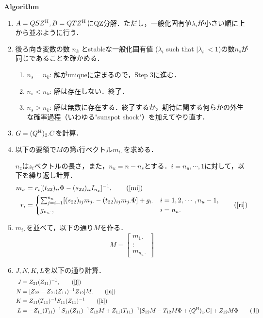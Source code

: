 \documentclass[a4j, dvipdfmx]{jarticle}
\begin{document}
\begin{itembox}[l]{{\bf Algorithm}}
\begin{enumerate}
\item $A = QSZ^{\rm{H}}, B = QTZ^{\rm{H}}$にQZ分解．ただし，一般化固有値$\lambda_i$が小さい順に上から並ぶように行う．
\item 後ろ向き変数の数 $n_k$ とstableな一般化固有値 ($\lambda_i$ such that $|\lambda_i|<1$)の数$n_s$が同じであることを確かめる．
\begin{enumerate}
\item $n_s = n_k$: 解がuniqueに定まるので，Step 3に進む．
\item $n_s < n_k$: 解は存在しない．終了．
\item $n_s > n_k$: 解は無数に存在する．終了するか，期待に関する何らかの外生な確率過程（いわゆる"sunspot shock"）を加えてやり直す．
\end{enumerate}
\item $G = (Q^{\rm{H}})_{2\cdot}C$を計算．
\item 以下の要領で$M$の第$i$行ベクトル$m_{i\cdot}$を求める．

$n_z$は$z_t$ベクトルの長さ，また，$n_u = n-n_s$とする．$i = n_u, \cdots, 1$に対して，以下を繰り返し計算．
\begin{align*}
m_{i\cdot} &= r_i[(t_{22})_{ii}\Phi - (s_{22})_{ii}I_{n_z}]^{-1},\tag{\ref{mi}}\\
r_i &= \begin{cases}\sum_{j = i+1}^{n_u}[(s_{22})_{ij}m_{j\cdot} - (t_{22})_{ij} m_{j\cdot}\Phi] + g_{i\cdot} &i = 1,2,\cdots,n_u-1,\\
g_{n_u\cdot}, &i = n_u.\end{cases}\tag{\ref{ri}}
\end{align*}
\item $m_{i\cdot}$を並べて，以下の通り$M$を作る．
\begin{align*}
M = \begin{bmatrix}m_{1\cdot} \\ \vdots \\ m_{n_u\cdot}\end{bmatrix} 
\end{align*}
\item $J,N,K,L$を以下の通り計算．
\begin{align}
J &= Z_{21}(Z_{11})^{-1},\tag{\ref{j}}\\
N &= [Z_{22} - Z_{21}(Z_{11})^{-1}Z_{12}]M. \tag{\ref{n}}\\
K &= Z_{11}(T_{11})^{-1}S_{11}(Z_{11})^{-1}\tag{\ref{k}}\\
L &= -Z_{11}(T_{11})^{-1}S_{11}(Z_{11})^{-1}Z_{12}M + Z_{11}(T_{11})^{-1}[S_{12}M - T_{12}M\Phi + (Q^{\rm{H}})_{1\cdot}C] + Z_{12}M\Phi\tag{\ref{l}}
\end{align}


\end{enumerate}
\end{itembox}
\end{document}
